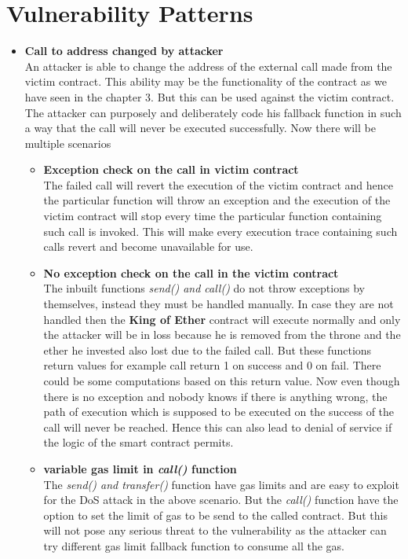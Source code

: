 \section{Vulnerability Patterns}
\begin{itemize}
    \item \textbf{Call to address changed by attacker}\\
    An attacker is able to change the address of the external call made from the victim contract. This ability may be the functionality of the contract as we have seen in the chapter 3. But this can be used against the victim contract. The attacker can purposely and deliberately code his fallback function in such a way that the call will never be executed successfully. Now there will be multiple scenarios
    \begin{itemize}
        \item \textbf{Exception check on the call in victim contract}\\
        The failed call will revert the execution of the victim contract and hence the particular function will throw an exception and the execution of the victim contract will stop every time the particular function containing such call is invoked. This will make every execution trace containing such calls revert and become unavailable for use.
        \item \textbf{No exception check on the call in the victim contract}\\
        The inbuilt functions \emph{send() and call()} do not throw exceptions by themselves, instead they must be handled manually. In case they are not handled then the \textbf{King of Ether} contract will execute normally and only the attacker will be in loss because he is removed from the throne and the ether he invested also lost due to the failed call. But these functions return values for example call return 1 on success and 0 on fail. There could be some computations based on this return value. Now even though there is no exception and nobody knows if there is anything wrong, the path of execution which is supposed to be executed on the success of the call will never be reached. Hence this can also lead to denial of service if the logic of the smart contract permits.
        \item \textbf{variable gas limit in \emph{call()} function}\\
        The \emph{send() and transfer()} function have gas limits and are easy to exploit for the DoS attack in the above scenario. But the \emph{call()} function have the option to set the limit of gas to be send to the called contract. But this will not pose any serious threat to the vulnerability as the attacker can try different gas limit fallback function to consume all the gas.

\end{itemize}
\end{itemize}
